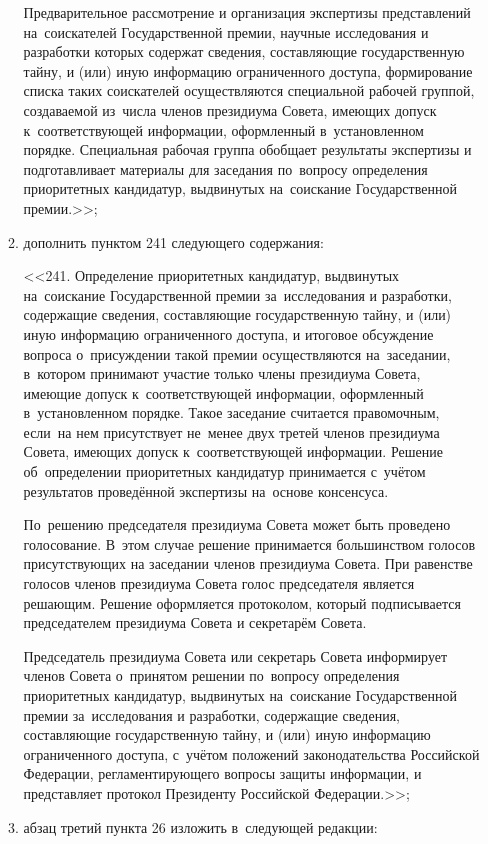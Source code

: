 \documentclass[14pt, a4paper]{extarticle}
\begin{document}
\begin{enumerate}
\begin{enumerate}[label=\asbuk*), ref=\asbuk*]
		Предварительное рассмотрение и организация экспертизы представлений на~соискателей Государственной премии, научные исследования и разработки которых содержат сведения, составляющие государственную тайну, и (или) иную информацию ограниченного доступа, формирование списка таких соискателей осуществляются специальной рабочей группой, создаваемой из~числа членов президиума Совета, имеющих допуск к~соответствующей информации, оформленный в~установленном порядке. Специальная рабочая группа обобщает результаты экспертизы и подготавливает материалы для заседания по~вопросу определения приоритетных кандидатур, выдвинутых на~соискание Государственной премии.>>;
		
		\item дополнить пунктом 241 следующего содержания:
		
		<<241. Определение приоритетных кандидатур, выдвинутых на~соискание Государственной премии за~исследования и разработки, содержащие сведения, составляющие государственную тайну, и (или) иную информацию ограниченного доступа, и итоговое обсуждение вопроса о~присуждении такой премии осуществляются на~заседании, в~котором принимают участие только члены президиума Совета, имеющие допуск к~соответствующей информации, оформленный в~установленном порядке. Такое заседание считается правомочным, если~на нем присутствует не~менее двух третей членов президиума Совета, имеющих допуск к~соответствующей информации. Решение об~определении приоритетных кандидатур принимается с~учётом результатов проведённой экспертизы на~основе \mbox{консенсуса}.
		
		По~решению председателя президиума Совета может быть проведено голосование. В~этом случае решение принимается большинством голосов присутствующих на заседании членов президиума Совета. При равенстве голосов членов президиума Совета голос председателя является решающим. Решение оформляется протоколом, который подписывается председателем президиума Совета и секретарём Совета.
		
		Председатель президиума Совета или секретарь Совета информирует членов Совета о~принятом решении по~вопросу определения приоритетных кандидатур, выдвинутых на~соискание Государственной премии за~исследования и разработки, содержащие сведения, составляющие государственную тайну, и (или) иную информацию ограниченного доступа, с~учётом положений законодательства Российской Федерации, регламентирующего вопросы защиты информации, и представляет протокол Президенту Российской Федерации.>>;
		
		\item абзац третий пункта 26 изложить в~следующей редакции:
		

\end{enumerate}
\end{enumerate}
\end{document}
